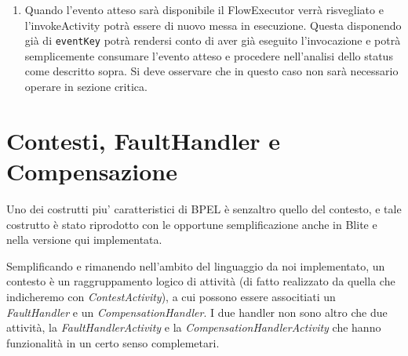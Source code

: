 \begin{enumerate}
  \item Quando l'evento atteso sarà disponibile il FlowExecutor verrà
  risvegliato e l'invokeActivity potrà essere di nuovo messa in esecuzione.
  Questa disponendo già di \texttt{eventKey} potrà rendersi conto di aver
  già eseguito l'invocazione e potrà semplicemente consumare l'evento
  atteso e procedere nell'analisi dello status come descritto sopra. Si deve
  osservare che in questo caso non sarà necessario operare in sezione critica.
\end{enumerate}

\section{Contesti, FaultHandler e Compensazione}

Uno dei costrutti piu' caratteristici di BPEL \`e senzaltro quello del
contesto, e tale costrutto \`e stato riprodotto con le opportune
semplificazione anche in Blite e nella versione qui implementata.

Semplificando e rimanendo nell'ambito del linguaggio da noi implementato, un
contesto \`e un raggruppamento logico di attivit\`a (di fatto realizzato da
quella che indicheremo con \emph{ContestActivity}), a cui possono essere
associtiati un \emph{FaultHandler} e un \emph{CompensationHandler}. I due
handler non sono altro che due attivit\`a, la \emph{FaultHandlerActivity} e
la \emph{CompensationHandlerActivity} che hanno funzionalit\`a in un certo
senso complemetari.

